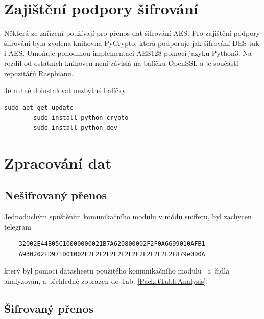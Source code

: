 
\section{Zajištění podpory šifrování}
Některá ze zařízení používají pro přenos dat šifrování AES. Pro zajištění podpory šifrování byla zvolena knihovna PyCrypto, která podporuje jak šifrování DES tak i AES. 
Umoňuje pohodlnou implementaci AES128 pomocí jazyku Python3. Na rozdíl od ostatních knihoven není závislá na balíčku OpenSSL a je součástí repozitářů Raspbianu. 

Je nutné doinstalovat nezbytné balíčky:	
 
\begin{lstlisting}[style=MyCodeBash]
		sudo apt-get update
		sudo install python-crypto
		sudo install python-dev
	\end{lstlisting}


\section{Zpracování dat}

\subsection{Nešifrovaný přenos}

Jednoduchým spuštěním komunikačního modulu v módu snifferu, byl zachycen telegram

\begin{verbatim}
	32002E44B05C10000000021B7A620800002F2F0A6699010AFB1
	A930202FD971D01002F2F2F2F2F2F2F2F2F2F2F2F2F879e0D0A
\end{verbatim}

který byl pomoci datasheetu použitého komunikačního modulu~\cite{ModulIQRF} a~čidla~\cite{CidloWeptech} analyzován, a přehledně zobrazen do Tab. \ref{PacketTableAnalysis}.

\subsection{Šifrovaný přenos}

